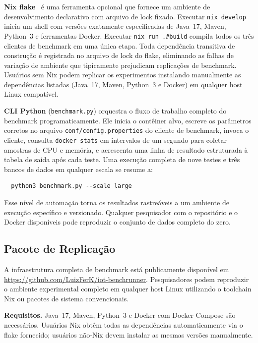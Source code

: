 \textbf{Nix flake}~\cite{nixos} é uma ferramenta opcional que fornece um ambiente de
desenvolvimento declarativo com arquivo de lock fixado. Executar \texttt{nix~develop} inicia
um shell com versões exatamente especificadas de Java~17, Maven, Python~3 e ferramentas Docker.
Executar \texttt{nix~run~.\#build} compila todos os três clientes de benchmark em uma única
etapa. Toda dependência transitiva de construção é registrada no arquivo de lock do flake,
eliminando as falhas de variação de ambiente que tipicamente prejudicam replicações de benchmark.
Usuários sem Nix podem replicar os experimentos instalando manualmente as dependências listadas
(Java~17, Maven, Python~3 e Docker) em qualquer host Linux compatível.

\textbf{CLI Python} (\texttt{benchmark.py}) orquestra o fluxo de trabalho completo do benchmark
programaticamente. Ele inicia o contêiner alvo, escreve os parâmetros corretos no arquivo
\texttt{conf/config.properties} do cliente de benchmark, invoca o cliente, consulta
\texttt{docker~stats} em intervalos de um segundo para coletar amostras de CPU e memória, e
acrescenta uma linha de resultado estruturada à tabela de saída após cada teste. Uma execução
completa de nove testes e três bancos de dados em qualquer escala se resume a:

\begin{verbatim}
  python3 benchmark.py --scale large
\end{verbatim}

Esse nível de automação torna os resultados rastreáveis a um ambiente de execução específico e
versionado. Qualquer pesquisador com o repositório e o Docker disponíveis pode reproduzir o
conjunto de dados completo do zero.

\subsection{Pacote de Replicação}
\label{sec:replication-pt}

A infraestrutura completa de benchmark está publicamente disponível em
\url{https://github.com/LuizFerK/iot-benchrunner}. Pesquisadores podem
reproduzir o ambiente experimental completo em qualquer host Linux
utilizando o toolchain Nix ou pacotes de sistema convencionais.

\textbf{Requisitos.} Java~17, Maven, Python~3 e Docker com Docker Compose
são necessários. Usuários Nix obtêm todas as dependências automaticamente
via o flake fornecido; usuários não-Nix devem instalar as mesmas versões
manualmente.

